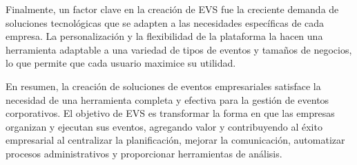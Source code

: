 Finalmente, un factor clave en la creación de EVS fue la creciente demanda de soluciones tecnológicas que se adapten a las 
necesidades específicas de cada empresa. La personalización y la flexibilidad de la plataforma la hacen una herramienta adaptable a 
una variedad de tipos de eventos y tamaños de negocios, lo que permite que cada usuario maximice su utilidad.

En resumen, la creación de soluciones de eventos empresariales satisface la necesidad de una herramienta completa y efectiva para la 
gestión de eventos corporativos. El objetivo de EVS es transformar la forma en que las empresas organizan y ejecutan sus eventos, agregando valor y 
contribuyendo al éxito empresarial al centralizar la planificación, mejorar la comunicación, automatizar procesos administrativos y proporcionar 
herramientas de análisis.



